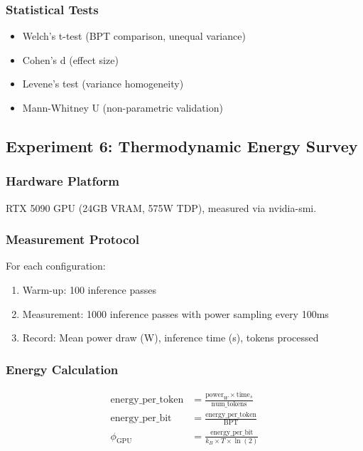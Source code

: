 \documentclass[11pt,a4paper]{article}
\begin{document}
\subsubsection{Statistical Tests}

\begin{itemize}
\item Welch's t-test (BPT comparison, unequal variance)
\item Cohen's d (effect size)
\item Levene's test (variance homogeneity)
\item Mann-Whitney U (non-parametric validation)
\end{itemize}

\subsection{Experiment 6: Thermodynamic Energy Survey}

\subsubsection{Hardware Platform}

RTX 5090 GPU (24GB VRAM, 575W TDP), measured via nvidia-smi.

\subsubsection{Measurement Protocol}

For each configuration:
\begin{enumerate}
\item Warm-up: 100 inference passes
\item Measurement: 1000 inference passes with power sampling every 100ms
\item Record: Mean power draw (W), inference time (s), tokens processed
\end{enumerate}

\subsubsection{Energy Calculation}

\begin{align}
\text{energy\_per\_token} &= \frac{\text{power}_W \times \text{time}_s}{\text{num\_tokens}} \\
\text{energy\_per\_bit} &= \frac{\text{energy\_per\_token}}{\text{BPT}} \\
\phi_{\text{GPU}} &= \frac{\text{energy\_per\_bit}}{k_B \times T \times \ln(2)}
\end{align}
\end{document}
